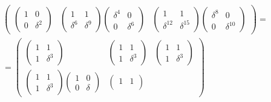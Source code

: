 \begin{multline*}
\begin{pmatrix}
\begin{pmatrix}
            1 & 0        \\
            0 & \delta^2
        \end{pmatrix}
         &
        \begin{pmatrix}
            1        & 1        \\
            \delta^6 & \delta^9
        \end{pmatrix}
        \begin{pmatrix}
            \delta^4 & 0        \\
            0        & \delta^6
        \end{pmatrix}
         &
        \begin{pmatrix}
            1           & 1           \\
            \delta^{12} & \delta^{15}
        \end{pmatrix}
        \begin{pmatrix}
            \delta^8 & 0           \\
            0        & \delta^{10}
        \end{pmatrix}
    \end{pmatrix} = \\
    =
    \begin{pmatrix}
        \begin{pmatrix}
            1 & 1        \\
            1 & \delta^3
        \end{pmatrix}
         &
        \begin{pmatrix}
            1 & 1        \\
            1 & \delta^3
        \end{pmatrix}
         &
        \begin{pmatrix}
            1 & 1        \\
            1 & \delta^3
        \end{pmatrix}
        \\
        \begin{pmatrix}
            1 & 1        \\
            1 & \delta^3
        \end{pmatrix}
        \begin{pmatrix}
            1 & 0      \\
            0 & \delta
        \end{pmatrix}
         &
        \begin{pmatrix}
            1 & 1        \\

\end{pmatrix}
\end{pmatrix}
\end{multline*}

